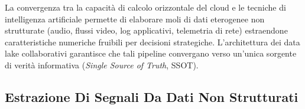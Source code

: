 \documentclass[11pt, a4paper]{article}
\begin{document}
La convergenza tra la capacità di calcolo orizzontale del cloud e le tecniche di intelligenza artificiale permette di elaborare moli di dati eterogenee non strutturate (audio, flussi video, log applicativi, telemetria di rete) estraendone caratteristiche numeriche fruibili per decisioni strategiche. L'architettura dei data lake collaborativi garantisce che tali pipeline convergano verso un'unica sorgente di verità informativa (\emph{Single Source of Truth}, SSOT).



\subsection{Estrazione Di Segnali Da Dati Non Strutturati}
\end{document}
